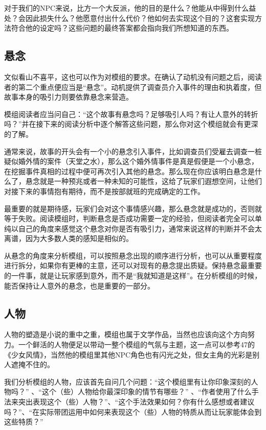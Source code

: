 \documentclass[a4paper,zihao=-4,notitlepage,twoside,openright]{ctexart}
\begin{document}
对于我们的NPC来说，比方一个大反派，他的目的是什么？他能从中得到什么益处？会因此损失什么？他愿意付出什么代价？他如何去实现这个目的？这套实现方法符合他的设定吗？这些问题的最终答案都会指向我们所想知道的东西。

\subsection{悬念}

文似看山不喜平，这也可以作为对模组的要求。在确认了动机没有问题之后，阅读者的第二个重点便应当是“悬念”。动机提供了调查员介入事件的理由和执着度，但故事本身的吸引力则要依靠悬念来营造。

模组阅读者应当问自己：“这个故事有悬念吗？足够吸引人吗？有让人意外的转折吗？”并在接下来的阅读分析中逐个解答这些问题，那么你对这个模组就会有更深的了解。

通常来说，故事的开头会有一个小的悬念引入事件，比如调查员们受雇去调查一桩疑似婚外情的案件（天堂之水），那么这个婚外情事件是真是假便是一个小悬念，在挖掘事件真相的过程中便可再次引入其他的悬念。那么现在你应该明白悬念是什么了，悬念就是一种预兆或者一种未知的可能性，这给了玩家们遐想空间，让他们对接下来的事情抱有期待，而不是按部就班的完成确定的工作。

最重要的就是期待感，玩家们会对这个事情感兴趣，那么悬念就是成功的，否则就等于失败。阅读模组时，判断悬念是否成功需要一定的经验，但阅读者完全可以单纯以自己的角度来感觉这个悬念对你是否有吸引力，通常来说这样的判断并不会太离谱，因为大多数人类的感知是相似的。

从悬念的角度来分析模组，可以按照悬念出现的顺序进行分析，也可以从重要程度进行拆分，如果你有更棒的主意，还可以对现有的悬念提出质疑。保持悬念最重要的一件事，就是让玩家感到意外，而不是“我就知道是这样”。在分析模组的时候，能否保持让人意外的悬念，也是重要的一部分。

\subsection{人物}

人物的塑造是小说的重中之重，模组也属于文学作品，当然也应该向这个方向努力。一个鲜活的人物便足以带动一整个模组的气氛与主题，这一点可以参考47的《少女风情》，当然他的模组里其他NPC角色也有闪光之处，但女主角的光彩是别人遮掩不住的。

我们分析模组的人物，应该首先自问几个问题：“这个模组里有让你印象深刻的人物吗？” 、“这个（些）人物给你最深印象的情节有哪些？” 、“作者使用了什么手法来突出表现这个（些）人物？”、“这个手法效果如何？你有什么感想或者建议吗？”、“在实际带团运用中如何来表现这个（些）人物的特质从而让玩家能体会到这些特质？”
\end{document}
